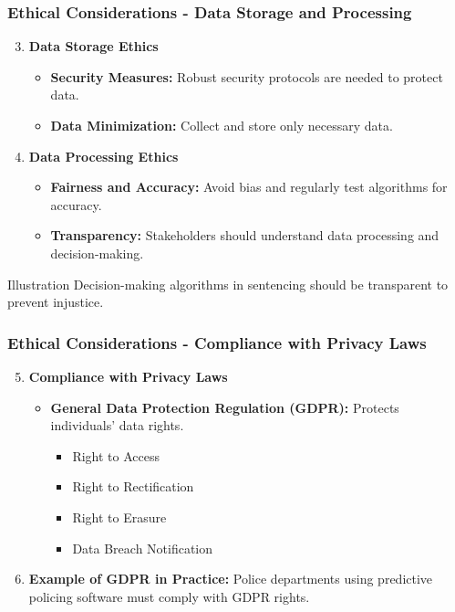 \documentclass[aspectratio=169]{beamer}
\begin{document}
\begin{frame}[fragile]
    \frametitle{Ethical Considerations - Data Storage and Processing}
    \begin{enumerate}
        \setcounter{enumi}{2}
        \item \textbf{Data Storage Ethics}
        \begin{itemize}
            \item \textbf{Security Measures:} Robust security protocols are needed to protect data.
            \item \textbf{Data Minimization:} Collect and store only necessary data.
        \end{itemize}
        \item \textbf{Data Processing Ethics}
        \begin{itemize}
            \item \textbf{Fairness and Accuracy:} Avoid bias and regularly test algorithms for accuracy.
            \item \textbf{Transparency:} Stakeholders should understand data processing and decision-making.
        \end{itemize}
    \end{enumerate}
    \begin{block}{Illustration}
        Decision-making algorithms in sentencing should be transparent to prevent injustice.
    \end{block}
\end{frame}

\begin{frame}[fragile]
    \frametitle{Ethical Considerations - Compliance with Privacy Laws}
    \begin{enumerate}
        \setcounter{enumi}{4}
        \item \textbf{Compliance with Privacy Laws}
        \begin{itemize}
            \item \textbf{General Data Protection Regulation (GDPR):} Protects individuals' data rights.
            \begin{itemize}
                \item Right to Access
                \item Right to Rectification
                \item Right to Erasure
                \item Data Breach Notification
            \end{itemize}
        \end{itemize}
        \item \textbf{Example of GDPR in Practice:} Police departments using predictive policing software must comply with GDPR rights.
    \end{enumerate}
\end{frame}
\end{document}
